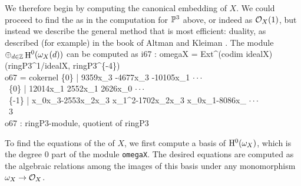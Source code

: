 We therefore begin by 
computing the canonical embedding of $X$. We could proceed
to find the 
as in the computation for $\P^3$ above, or indeed
as $\cO_X(1)$, but instead we describe the general
method that is most efficient: duality, as described (for
example) in the book of Altman and Kleiman \cite{ak}. The 
module $\oplus_{d\in \Z}\mathop{\rm H}\nolimits^0(\omega_X(d))$ can be
computed as
\beginOutput
i67 : omegaX = Ext^(codim idealX)(ringP3^1/idealX, ringP3^\{-4\})\\
\emptyLine
o67 = cokernel \{0\}  | 9359x_3           -4677x_3         -10105x_1     $\cdot\cdot\cdot$\\
\               \{0\}  | 12014x_1          2552x_1          2626x_0       $\cdot\cdot\cdot$\\
\               \{-1\} | x_0x_3-2553x_2x_3 x_1^2-1702x_2x_3 x_0x_1-8086x_ $\cdot\cdot\cdot$\\
\emptyLine
\                                       3\\
o67 : ringP3-module, quotient of ringP3\\
\endOutput

To find the equations of
the  of $X$, we 
first compute a basis of ${\rm H}^0(\omega_X)$, which
is the degree 0 part of the module {\tt omegaX}.
The desired equations are computed as the algebraic
relations among the images of this basis under any
monomorphism $\omega_X \to \O_X$.

